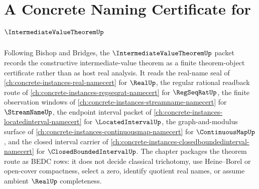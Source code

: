 \chapter{A Concrete Naming Certificate for $\IntermediateValueTheoremUp$}
\label{ch:concrete-instances-intermediate-value-theorem-namecert}

Following Bishop and Bridges, the $\IntermediateValueTheoremUp$ packet records the constructive intermediate-value theorem as a finite theorem-object certificate rather than as host real analysis. It reads the real-name seal of \autoref{ch:concrete-instances-real-namecert} for $\RealUp$, the regular rational readback route of \autoref{ch:concrete-instances-regseqrat-namecert} for $\RegSeqRatUp$, the finite observation windows of \autoref{ch:concrete-instances-streamname-namecert} for $\StreamNameUp$, the endpoint interval packet of \autoref{ch:concrete-instances-locatedinterval-namecert} for $\LocatedIntervalUp$, the graph-and-modulus surface of \autoref{ch:concrete-instances-continuousmap-namecert} for $\ContinuousMapUp$, and the closed interval carrier of \autoref{ch:concrete-instances-closedboundedinterval-namecert} for $\ClosedBoundedIntervalUp$. The chapter packages the theorem route as BEDC rows: it does not decide classical trichotomy, use Heine--Borel or open-cover compactness, select a zero, identify quotient real names, or assume ambient $\RealUp$ completeness.

